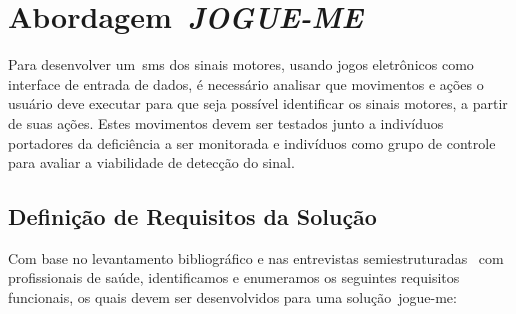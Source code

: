 \chapter{Abordagem~\textit{JOGUE-ME}}\label{chapter:abordagem_gahme}
Para desenvolver um~\ac{sms} dos sinais motores, usando jogos eletrônicos como interface de entrada de dados, é necessário analisar que movimentos e ações o usuário deve executar para que seja possível identificar os sinais motores, a partir de suas ações. Estes movimentos devem ser testados junto a indivíduos portadores da deficiência a ser monitorada e indivíduos como grupo de controle para avaliar a viabilidade de detecção do sinal.

\section{Definição de Requisitos da Solução}\label{section:requisitos_solucao}
Com base no levantamento bibliográfico e nas entrevistas semiestruturadas~\cite{FLI04} com profissionais de saúde, identificamos e enumeramos os seguintes requisitos funcionais, os quais devem ser desenvolvidos para uma solução~\ac{jogue-me}:



